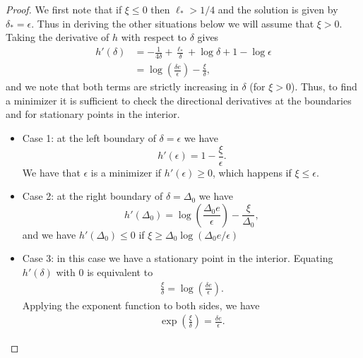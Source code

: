 \documentclass[10pt]{article} %
\begin{document}
\begin{proof}
We first note that if $\xi \leq 0$ then $\ell_* > 1/4$ and 
 the solution is given by $\delta_*=\epsilon$. Thus in deriving the other situations below we will assume that $\xi > 0$.
    Taking the derivative of $h$  with respect to $\delta$ gives
    \begin{align*}
h'(\delta) & = -\frac{1}{4\delta} + \frac{\ell_*}{\delta} + \log\delta + 1 -\log\epsilon\\
& = \log\left(\frac{\delta e}{\epsilon}\right) - \frac{\xi}{\delta},
    \end{align*}
    and we note that both terms are strictly increasing in $\delta$ (for $\xi > 0$). Thus,
to find a minimizer it is sufficient to check the directional derivatives at the boundaries and for stationary points in the interior.
    \begin{itemize}
    \item Case 1: at the left boundary of $\delta = \epsilon$ we have
    \[
    h'(\epsilon) = 1 - \frac \xi \epsilon.
    \]
We have that $\epsilon$ is a minimizer if $h'(\epsilon) \geq 0$, which happens if $\xi \leq \epsilon$.
\item Case 2: at the right boundary of $\delta = \Delta_0$ we have
\[
h'(\Delta_0) = \log\left(\frac{\Delta_0 e}{\epsilon}\right) - \frac{\xi}{\Delta_0},
\]
and we have $h'(\Delta_0) \leq 0$ if $\xi \geq \Delta_0\log(\Delta_0 e/\epsilon)$
\item Case 3: in this case we have a stationary point in the interior. 
        Equating $h'(\delta)$ with 0 is equivalent to 
\begin{align*}
    \frac{\xi}{\delta} = \log\left(\frac{\delta e}{\epsilon}\right).
\end{align*}
Applying the exponent function to both sides, we have
\begin{align*}
    \exp\left(\frac \xi \delta\right) = \frac{\delta e}{\epsilon}.
\end{align*}

\end{itemize}
\end{proof}
\end{document}
